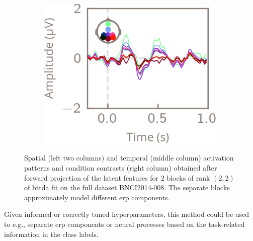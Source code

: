 \begin{figure}[t]
  \begin{subfigure}[b]{\linewidth}
    \begin{minipage}[b]{.15\linewidth}
      \vspace{3em}
    \end{minipage}\hfill%
    \begin{minipage}[b]{.15\linewidth}
      \vspace{3em}
    \end{minipage}\hfill%
    \begin{minipage}[b]{.25\linewidth}
    \end{minipage}\hfill%
    \begin{minipage}[b]{.3\linewidth}
      \includegraphics[width=\linewidth]{figures/bttda/forward_block-1_contrast.png}
    \end{minipage}
  \end{subfigure}

  \caption[Extracted \acs{bttda} activation patterns.]{%
    Spatial (left two columns) and temporal (middle column) activation patterns and
		condition contrasts (right column) obtained after forward projection of the latent
    features for 2 blocks of rank $(2,2)$ of \ac{bttda}
    fit on the full dataset BNCI2014-008.
    The separate blocks approximately model different \ac{erp}
		components.}
	\label{fig:forward}
\end{figure}
Given informed or correctly tuned hyperparameters, this method could be used to
e.g., separate \ac{erp} components or neural processes based on the task-related
information in the class labels.


